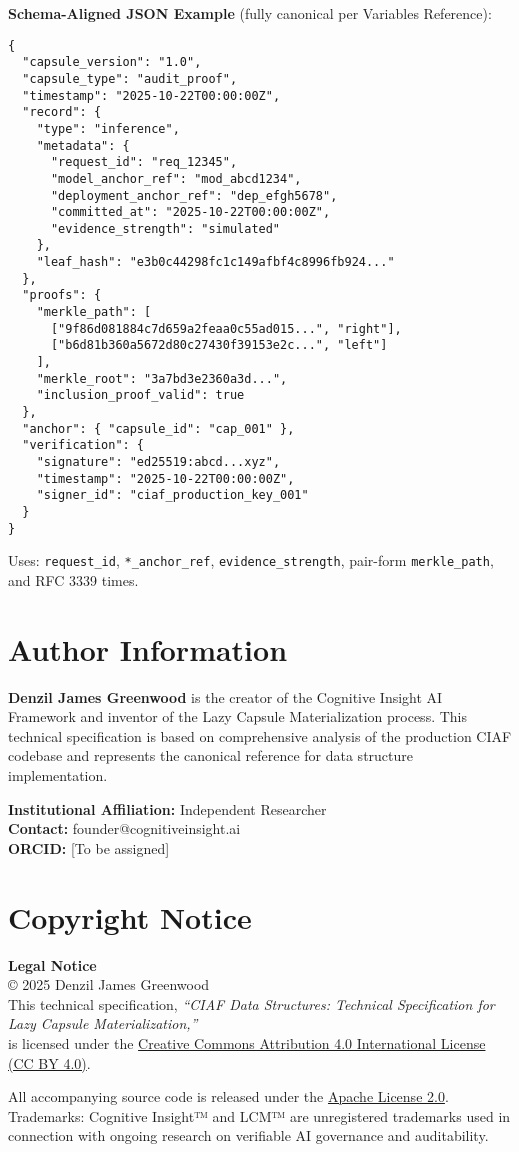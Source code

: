 \documentclass[12pt,a4paper]{article}
\begin{document}
\textbf{Schema-Aligned JSON Example} (fully canonical per Variables Reference):

\begin{lstlisting}[caption=Canonical JSON Example]
{
  "capsule_version": "1.0",
  "capsule_type": "audit_proof",
  "timestamp": "2025-10-22T00:00:00Z",
  "record": {
    "type": "inference",
    "metadata": {
      "request_id": "req_12345",
      "model_anchor_ref": "mod_abcd1234",
      "deployment_anchor_ref": "dep_efgh5678",
      "committed_at": "2025-10-22T00:00:00Z",
      "evidence_strength": "simulated"
    },
    "leaf_hash": "e3b0c44298fc1c149afbf4c8996fb924..."
  },
  "proofs": {
    "merkle_path": [
      ["9f86d081884c7d659a2feaa0c55ad015...", "right"],
      ["b6d81b360a5672d80c27430f39153e2c...", "left"]
    ],
    "merkle_root": "3a7bd3e2360a3d...",
    "inclusion_proof_valid": true
  },
  "anchor": { "capsule_id": "cap_001" },
  "verification": {
    "signature": "ed25519:abcd...xyz",
    "timestamp": "2025-10-22T00:00:00Z",
    "signer_id": "ciaf_production_key_001"
  }
}
\end{lstlisting}

Uses: \texttt{request\_id}, \texttt{*\_anchor\_ref}, \texttt{evidence\_strength}, pair-form \texttt{merkle\_path}, and RFC 3339 times.

\newpage

\section*{Author Information}

\textbf{Denzil James Greenwood} is the creator of the Cognitive Insight AI Framework and inventor of the Lazy Capsule Materialization process. This technical specification is based on comprehensive analysis of the production CIAF codebase and represents the canonical reference for data structure implementation.

\textbf{Institutional Affiliation:} Independent Researcher \\
\textbf{Contact:} founder@cognitiveinsight.ai \\
\textbf{ORCID:} [To be assigned]

\section*{Copyright Notice}

\begin{infobox}
\textbf{Legal Notice}\\
© 2025 Denzil James Greenwood \\
This technical specification, \textit{``CIAF Data Structures: Technical Specification for Lazy Capsule Materialization,''} \\
is licensed under the \href{https://creativecommons.org/licenses/by/4.0/}{Creative Commons Attribution 4.0 International License (CC BY 4.0)}.

All accompanying source code is released under the \href{https://www.apache.org/licenses/LICENSE-2.0}{Apache License 2.0}. \\
Trademarks: Cognitive Insight™ and LCM™ are unregistered trademarks used in connection with ongoing research on verifiable AI governance and auditability.
\end{infobox}
\end{document}
